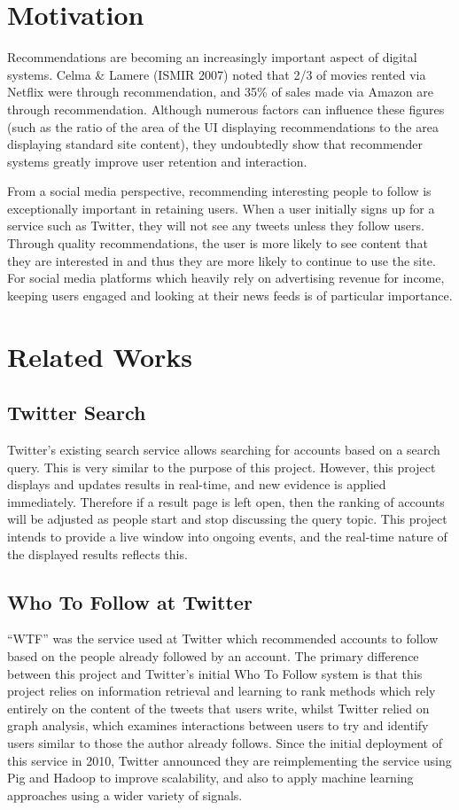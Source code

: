 \documentclass{l4proj}
\begin{document}
\section{Motivation}
Recommendations are becoming an increasingly important aspect of digital systems. Celma \& Lamere (ISMIR 2007) noted that 2/3 of movies rented via Netflix were through recommendation, and 35\% of sales made via Amazon are through recommendation. Although numerous factors can influence these figures (such as the ratio of the area of the UI displaying recommendations to the area displaying standard site content), they undoubtedly show that recommender systems greatly improve user retention and interaction.

From a social media perspective, recommending interesting people to follow is exceptionally important in retaining users. When a user initially signs up for a service such as Twitter, they will not see any tweets unless they follow users. Through quality recommendations, the user is more likely to see content that they are interested in and thus they are more likely to continue to use the site. For social media platforms which heavily rely on advertising revenue for income, keeping users engaged and looking at their news feeds is of particular importance.

\section{Related Works}

\subsection{Twitter Search}
Twitter’s existing search service allows searching for accounts based on a search query. This is very similar to the purpose of this project. However, this project displays and updates results in real-time, and new evidence is applied immediately. Therefore if a result page is left open, then the ranking of accounts will be adjusted as people start and stop discussing the query topic. This project intends to provide a live window into ongoing events, and the real-time nature of the displayed results reflects this.

\subsection{Who To Follow at Twitter}
“WTF” was the service used at Twitter which recommended accounts to follow based on the people already followed by an account. The primary difference between this project and Twitter’s initial Who To Follow system is that this project relies on information retrieval and learning to rank methods which rely entirely on the content of the tweets that users write, whilst Twitter relied on graph analysis, which examines interactions between users to try and identify users similar to those the author already follows. Since the initial deployment of this service in 2010, Twitter announced they are reimplementing the service using Pig and Hadoop to improve scalability, and also to apply machine learning approaches using a wider variety of signals.
\end{document}
